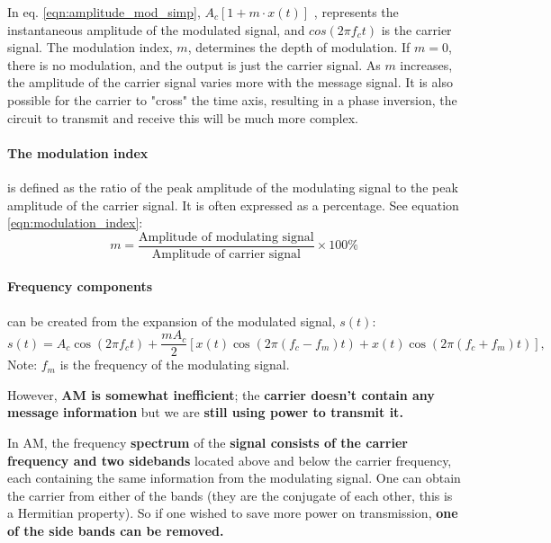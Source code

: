 \documentclass[../../../../DMCC-My-Notebook]{subfiles}
\begin{document}
			In eq. \ref{eqn:amplitude_mod_simp},  $A_c [1 + m \cdot x(t)]$ , represents the instantaneous amplitude of the modulated signal, and $ cos(2\pi f_c t)$ is the carrier signal. \linebreak
			The modulation index, $m$, determines the depth of modulation. If $m=0$, there is no modulation, and the output is just the carrier signal. As $m$ increases, the amplitude of the carrier signal varies more with the message signal. It is also possible for the carrier to "cross" the time axis, resulting in a phase inversion, the circuit to transmit and receive this will be much more complex.\linebreak
			
			\paragraph{The modulation index} is defined as the ratio of the peak amplitude of the modulating signal to the peak amplitude of the carrier signal. It is often expressed as a percentage. See equation \ref{eqn:modulation_index}:
			\begin{equation}
				m = \frac{\text{Amplitude of modulating signal}}{\text{Amplitude of carrier signal}} \times 100\%
			\end{equation}\label{eqn:modulation_index}
			
			\paragraph{Frequency components} can be created from the expansion of the modulated signal, $s(t)$:
			\begin{equation}
				s(t) = A_c \cos(2\pi f_c t) + \frac{mA_c}{2} [x(t) \cos(2\pi (f_c - f_m) t) + x(t) \cos(2\pi (f_c + f_m) t)],
			\end{equation}\label{eqn:frequency_components}
			Note: $f_m$ is the frequency of the modulating signal. \linebreak
			
			However,\textbf{ AM is somewhat inefficient}; the \textbf{carrier doesn't contain any message information} but we are \textbf{still using power to transmit it.}
			
			In AM, the frequency \textbf{spectrum} of the \textbf{signal consists of the carrier frequency and two sidebands} located above and below the carrier frequency, each containing the same information from the modulating signal. One can obtain the carrier from either of the bands (they are the conjugate of each other, this is a Hermitian property). So if one wished to save more power on transmission, \textbf{one of the side bands can be removed.} \linebreak
			
\end{document}
